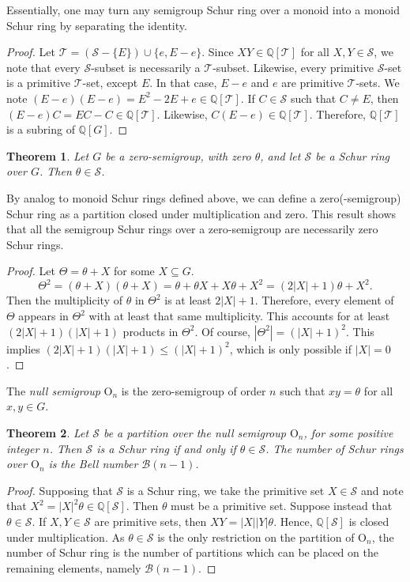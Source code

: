 \documentclass{article}
\theoremstyle{plain}
\newtheorem{Thm}{Theorem}[section]
\theoremstyle{definition}
\renewcommand{\S}{\mathcal{S}}
\newcommand{\T}{\mathcal{T}}
\newcommand{\Q}{\mathbb{Q}}
\newcommand{\QG}{\Q[G]}
\newcommand{\QS}{\Q[\S]}
\newcommand{\QT}{\Q[\T]}
\newcommand{\B}{\mathscr{B}}
\renewcommand{\O}{\mathrm{O}}
\begin{document}
Essentially, one may turn any semigroup Schur ring over a monoid into a monoid Schur ring by separating the identity.

\begin{proof}
    Let $\T = (\S - \{E\}) \cup \{e, E - e\}$. Since $XY\in \QT$ for all $X,Y\in \S$, we note that every $\S$-subset is necessarily a $\T$-subset. Likewise, every primitive $\S$-set is a primitive $\T$-set, except $E$. In that case, $E-e$ and $e$ are primitive $\T$-sets. We note $(E-e)(E-e) = E^2 - 2E + e\in \QT$. If $C\in \S$ such that $C\neq E$, then $(E-e)C = EC-C\in \QT$. Likewise, $C(E-e)\in \QT$. Therefore, $\QT$ is a subring of $\QG$.
\end{proof}

\begin{Thm}\label{thm:zeroschur} Let $G$ be a zero-semigroup, with zero $\theta$, and let $\S$ be a Schur ring over $G$. Then $\theta\in \S$. 
\end{Thm}

By analog to monoid Schur rings defined above, we can define a zero(-semigroup) Schur ring as a partition closed under multiplication and zero. This result shows that all the semigroup Schur rings over a zero-semigroup are necessarily zero Schur rings.

\begin{proof}
    Let $\Theta = \theta + X$ for some $X\subseteq G$. 
\[\Theta^2 = (\theta + X)(\theta + X) = \theta + \theta X+X\theta + X^2 = (2|X|+1)\theta + X^2.\] 
    Then the multiplicity of $\theta$ in $\Theta^2$ is at least $2|X|+1$. Therefore, every element of $\Theta$ appears in $\Theta^2$ with at least that same multiplicity. This accounts for at least $(2|X|+1)(|X|+1)$ products in $\Theta^2$. Of course, $|\Theta^2| = (|X|+1)^2$. This implies $(2|X|+1)(|X|+1) \le (|X|+1)^2$, which is only possible if $|X|=0$.
\end{proof}

The \label{null}\emph{null semigroup} $\O_n$ is the zero-semigroup of order $n$ such that $xy = \theta$ for all $x,y\in G$.

\begin{Thm}\label{thm:nullschur} Let $\S$ be a partition over the null semigroup $\text{O}_n$, for some positive integer $n$. Then $\S$ is a Schur ring if and only if $\theta\in \S$. The number of Schur rings over $\text{O}_n$ is the Bell number $\B(n-1)$.
\end{Thm}
\begin{proof}
Supposing that $\S$ is  a Schur ring, we take the primitive set $X\in\S$ and note that $X^2 = |X|^2 \theta\in \QS$. Then $\theta$ must be a primitive set. Suppose instead that $\theta\in \S$. If $X,Y\in \S$ are primitive sets, then $XY = |X||Y|\theta$. Hence, $\QS$ is closed under multiplication. As $\theta\in \S$ is the only restriction on the partition of $\O_n$, the number of Schur ring is the number of partitions which can be placed on the remaining elements, namely $\B(n-1)$.
\end{proof}
\end{document}
